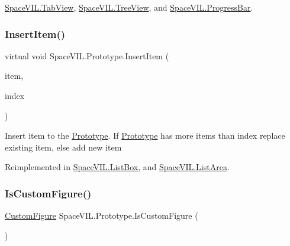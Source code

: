 \mbox{\hyperlink{class_space_v_i_l_1_1_tab_view_ae19ec535e78dee9eca9ac433e2b2bca5}{Space\+V\+I\+L.\+Tab\+View}}, \mbox{\hyperlink{class_space_v_i_l_1_1_tree_view_ac44a1df7d58a35e35842170162645e08}{Space\+V\+I\+L.\+Tree\+View}}, and \mbox{\hyperlink{class_space_v_i_l_1_1_progress_bar_a61f9a8602172eebf205ed6eee8cb3e30}{Space\+V\+I\+L.\+Progress\+Bar}}.

\mbox{\label{class_space_v_i_l_1_1_prototype_a9dd004dfa4ca2ea37c21770a24434270}} 
\subsubsection{\texorpdfstring{Insert\+Item()}{InsertItem()}}
{\footnotesize\ttfamily virtual void Space\+V\+I\+L.\+Prototype.\+Insert\+Item (\begin{DoxyParamCaption}\item[{\mbox{\hyperlink{interface_space_v_i_l_1_1_core_1_1_i_base_item}{I\+Base\+Item}}}]{item,  }\item[{Int32}]{index }\end{DoxyParamCaption})\hspace{0.3cm}{\ttfamily [virtual]}}



Insert item to the \mbox{\hyperlink{class_space_v_i_l_1_1_prototype}{Prototype}}. If \mbox{\hyperlink{class_space_v_i_l_1_1_prototype}{Prototype}} has more items than index replace existing item, else add new item 



Reimplemented in \mbox{\hyperlink{class_space_v_i_l_1_1_list_box_a3d5da8acbfd4f0bb11594b5f4b9001c0}{Space\+V\+I\+L.\+List\+Box}}, and \mbox{\hyperlink{class_space_v_i_l_1_1_list_area_a44efda800a4a280b7a452bd09c90f484}{Space\+V\+I\+L.\+List\+Area}}.

\mbox{\label{class_space_v_i_l_1_1_prototype_ad370acd0c610b7a7dc6d402b0cccf09a}} 
\subsubsection{\texorpdfstring{Is\+Custom\+Figure()}{IsCustomFigure()}}
{\footnotesize\ttfamily \mbox{\hyperlink{class_space_v_i_l_1_1_decorations_1_1_custom_figure}{Custom\+Figure}} Space\+V\+I\+L.\+Prototype.\+Is\+Custom\+Figure (\begin{DoxyParamCaption}{ }\end{DoxyParamCaption})}



